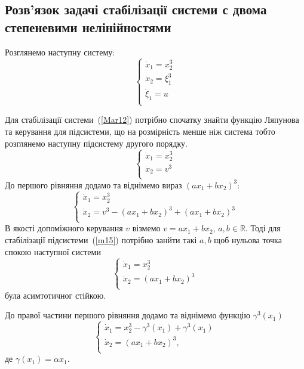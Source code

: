 \documentclass{article}
\begin{document}
\subsection{Розв'язок задачі стабілізації системи с двома степеневими нелінійностями}
Розглянемо наступну систему:
\begin{equation}\label{3dim nonlinear system}
    \begin{cases}
    \dot x_1 = x_2^3 \\
    \dot x_2 = \xi_1^3\\
    \dot \xi_1 = u\\
    \end{cases}
\end{equation}

Для стабілізації системи~(\ref{Mar12}) потрібно спочатку знайти функцію Ляпунова
та керування для підсистеми, що на розмірність менше ніж система  тобто розглянемо 
наступну підсистему другого порядку. 
\begin{equation} \label{2dim nonlinear system}
    \begin{cases}
    \dot x_1 = x_2^3\\
    \dot x_2 = v^3\\
    \end{cases}
\end{equation}
До першого рівняння додамо та віднімемо вираз $(ax_1+bx_2)^3$:
\begin{equation}\label{m15}
    \begin{cases}
    \dot x_1 = x_{2}^3 \\
    \dot x_2 = v^3 - (ax_1+bx_2)^3 +(ax_1+bx_2)^3 \\
    \end{cases}
\end{equation}
В якості допоміжного керування $v$ візмемо $v=ax_1+bx_2$, $a,b \in \mathbb{R}$. Тоді
для стабілізації підсистеми~(\ref{m15}) потрібно занйти такі  $a,b$ щоб нульова точка спокою 
наступної системи
\begin{equation}\label{2dim nonlinear system2}
    \begin{cases}
    \dot x_1 =x_{2}^3 \\
    \dot x_2 =(ax_1+bx_2)^3 \\
    \end{cases}
\end{equation}
була асимтотичног стійкою.


До правої частини першого рівняння додамо та віднімемо функцію $\gamma^3(x_1)$ 
\begin{equation} \label{m17}
    \begin{cases}
    \dot x_1 =x_{2}^3 -\gamma^3(x_1)+\gamma^3(x_1) \\
    \dot x_2 = (ax_1+bx_2)^3,\\
    \end{cases}
\end{equation}
де $\gamma(x_1) = \alpha x_1$.
\end{document}
